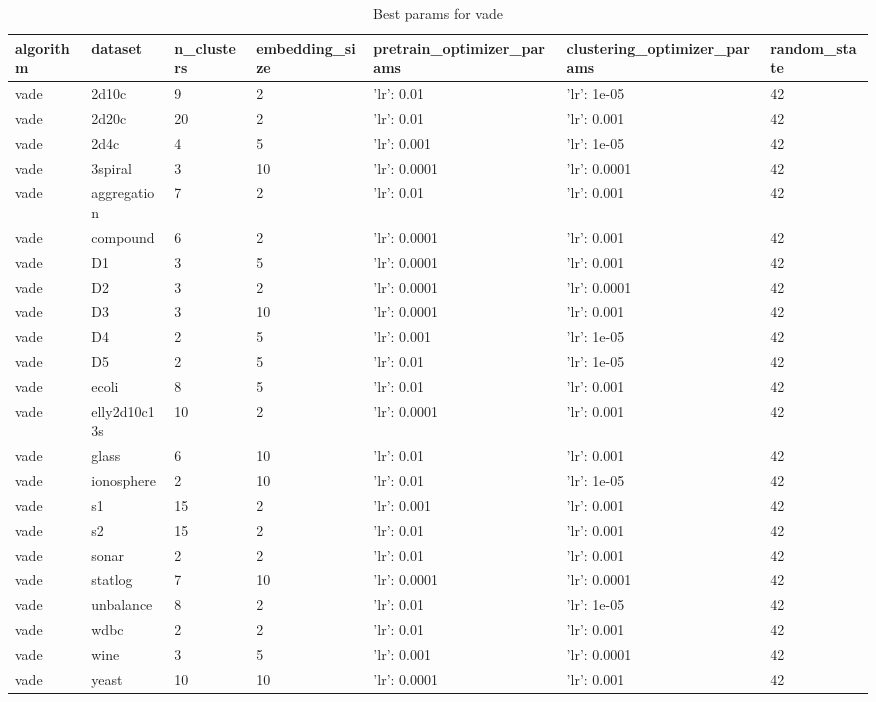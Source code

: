 \begin{table}[H]
\centering
\caption{Best params for vade}
\label{S48_Table}
\begin{tabular}{|l|l|l|l|l|l|l|}
\hline
algorithm & dataset & n\_clusters & embedding\_size & pretrain\_optimizer\_params & clustering\_optimizer\_params & random\_state \\
\hline
vade & 2d10c & 9 & 2 & {'lr': 0.01} & {'lr': 1e-05} & 42 \\
\hline
vade & 2d20c & 20 & 2 & {'lr': 0.01} & {'lr': 0.001} & 42 \\
\hline
vade & 2d4c & 4 & 5 & {'lr': 0.001} & {'lr': 1e-05} & 42 \\
\hline
vade & 3spiral & 3 & 10 & {'lr': 0.0001} & {'lr': 0.0001} & 42 \\
\hline
vade & aggregation & 7 & 2 & {'lr': 0.01} & {'lr': 0.001} & 42 \\
\hline
vade & compound & 6 & 2 & {'lr': 0.0001} & {'lr': 0.001} & 42 \\
\hline
vade & D1 & 3 & 5 & {'lr': 0.0001} & {'lr': 0.001} & 42 \\
\hline
vade & D2 & 3 & 2 & {'lr': 0.0001} & {'lr': 0.0001} & 42 \\
\hline
vade & D3 & 3 & 10 & {'lr': 0.0001} & {'lr': 0.001} & 42 \\
\hline
vade & D4 & 2 & 5 & {'lr': 0.001} & {'lr': 1e-05} & 42 \\
\hline
vade & D5 & 2 & 5 & {'lr': 0.01} & {'lr': 1e-05} & 42 \\
\hline
vade & ecoli & 8 & 5 & {'lr': 0.01} & {'lr': 0.001} & 42 \\
\hline
vade & elly2d10c13s & 10 & 2 & {'lr': 0.0001} & {'lr': 0.001} & 42 \\
\hline
vade & glass & 6 & 10 & {'lr': 0.01} & {'lr': 0.001} & 42 \\
\hline
vade & ionosphere & 2 & 10 & {'lr': 0.01} & {'lr': 1e-05} & 42 \\
\hline
vade & s1 & 15 & 2 & {'lr': 0.001} & {'lr': 0.001} & 42 \\
\hline
vade & s2 & 15 & 2 & {'lr': 0.01} & {'lr': 0.001} & 42 \\
\hline
vade & sonar & 2 & 2 & {'lr': 0.01} & {'lr': 0.001} & 42 \\
\hline
vade & statlog & 7 & 10 & {'lr': 0.0001} & {'lr': 0.0001} & 42 \\
\hline
vade & unbalance & 8 & 2 & {'lr': 0.01} & {'lr': 1e-05} & 42 \\
\hline
vade & wdbc & 2 & 2 & {'lr': 0.01} & {'lr': 0.001} & 42 \\
\hline
vade & wine & 3 & 5 & {'lr': 0.001} & {'lr': 0.0001} & 42 \\
\hline
vade & yeast & 10 & 10 & {'lr': 0.0001} & {'lr': 0.001} & 42 \\
\hline
\end{tabular}
\end{table}

